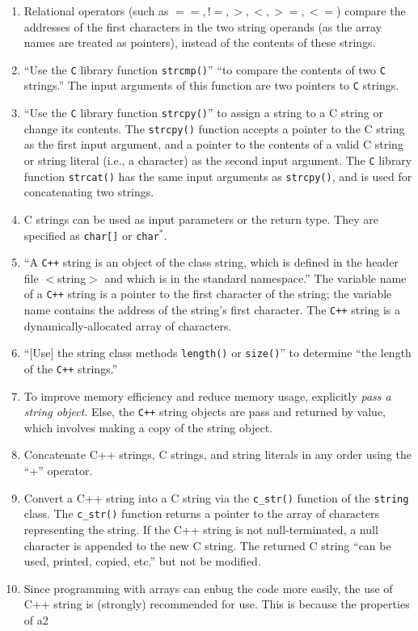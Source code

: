 \begin{enumerate}
\begin{enumerate}
\begin{enumerate}
		\item Relational operators (such as $==, !=, >, <, >=, <=$) compare the addresses of the first characters in the two string operands (as the array names are treated as pointers), instead of the contents of these strings.
		\item ``Use the {\tt C} library function {\tt strcmp()}'' ``to compare the contents of two {\tt C} strings.'' The input arguments of this function are two pointers to {\tt C} strings.
		\item ``Use the {\tt C} library function {\tt strcpy()}'' to assign a string to a C string or change its contents. The {\tt strcpy()} function accepts a pointer to the C string as the first input argument, and a pointer to the contents of a valid C string or string literal (i.e., a character) as the second input argument. The {\tt C} library function {\tt strcat()} has the same input arguments as {\tt strcpy()}, and is used for concatenating two strings.
		\item C strings can be used as input parameters or the return type. They are specified as {\tt char[]} or {\tt char$^{\ast}$}.
		\item ``A {\tt C++} string is an object of the class string, which is defined in the header file $<$string$>$ and which is in the standard namespace.'' The variable name of a {\tt C++} string is a pointer to the first character of the string; the variable name contains the address of the string's first character. The {\tt C++} string is a dynamically-allocated array of characters.
		\item ``[Use] the string class methods {\tt length()} or {\tt size()}'' to determine ``the length of the {\tt C++} strings.''
		\item To improve memory efficiency and reduce memory usage, explicitly {\it pass a string object}. Else, the {\tt C++} string objects are pass and returned by value, which involves making a copy of the string object.
		\item Concatenate C++ strings, C strings, and string literals in any order using the ``+'' operator.
		\item Convert a C++ string into a C string via the {\tt c\_str()} function of the {\tt string} class. The {\tt c\_str()} function returns a pointer to the array of characters representing the string. If the C++ string is not null-terminated, a null character is appended to the new C string. The returned C string ``can be used, printed, copied, etc.'' but not be modified.
		\item Since programming with arrays can enbug the code more easily, the use of C++ {string} is (strongly) recommended for use. This is because the properties of a2

\end{enumerate}
\end{enumerate}
\end{enumerate}
